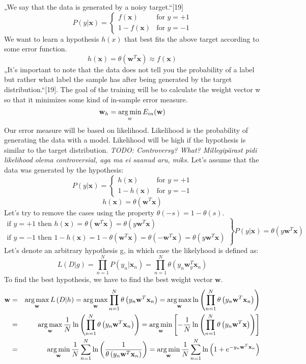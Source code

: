 „We say that the data is generated by a noisy target.“[19]
\[ P(y|\mathbf{x}) = \left\{
\begin{array}{ll}
f(\mathbf{x}) & \mbox{for } y = +1 \\
1 - f(\mathbf{x}) & \mbox{for } y = -1
\end{array} \right. \]
We want to learn a hypothesis $h(x)$ that best fits the above target according to some error function.
\[h(\mathbf{x}) = \theta \left( \mathbf{w}^T \mathbf{x} \right)\approx f(\mathbf{x})\]
„It's important to note that the data does not tell you the probability of a label but rather what label the sample has after being generated by the target distribution.“[19]. The goal of the training will be to calculate the weight vector w so that it minimizes some kind of in-sample error measure.
\[\mathbf{w}_h = \operatorname*{arg\,min}_w E_{in} (\mathbf{w})\]
Our error measure will be based on likelihood. Likelihood is the probability of generating the data with a model. Likelihood will be high if the hypothesis is similar to the target distribution. \emph{TODO: Controversy? What? Millegipärast pidi likelihood olema controversial, aga ma ei saanud aru, miks.} Let's assume that the data was generated by the hypothesis:
\[P(y|\mathbf{x}) = \left\{ 
\begin{array}{ll}
h(\mathbf{x}) & \mbox{for } y = + 1 \\
1 - h(\mathbf{x}) & \mbox{for } y = -1
\end{array}
\right.\]
\[h(\mathbf{x}) = \theta (\mathbf{w}^T \mathbf{x})\]
Let's try to remove the cases using the property $\theta(-s) = 1 - \theta (s)$.
\[\left.
\begin{array}{l}
\mbox{if $y=+1$ then } h(\mathbf{x}) = \theta (\mathbf{w}^T \mathbf{x}) = \theta (y \mathbf{w}^T \mathbf{x}) \\
\mbox{if $y=-1$ then } 1 - h(\mathbf{x}) = 1 - \theta (\mathbf{w}^T \mathbf{x}) = \theta (-\mathbf{w}^T \mathbf{x}) = \theta (y \mathbf{w}^T \mathbf{x})
\end{array}
\right\} P(y | \mathbf{x}) = \theta(y \mathbf{w}^T \mathbf{x})\]
Let's denote an arbitrary hypothesis g, in which case the likelyhood is defined as:
\[L(D|g) = \prod_{n=1}^N P(y_n | \mathbf{x}_n) = \prod_{n=1}^N \theta(y_n \mathbf{w}_g^T \mathbf{x}_n)\]
To find the best hypothesis, we have to find the best weight vector $\mathbf{w}$.
\begin{eqnarray*}
\mathbf{w} & = & \operatorname*{arg\,max}_\mathbf{w} L \left( D|h \right) = \operatorname*{arg\,max}_\mathbf{w} \prod_{n=1}^N  \theta \left( y_n \mathbf{w}^T \mathbf{x}_n \right) = \operatorname*{arg\,max}_\mathbf{w} \ln \left( \prod_{n=1}^N \theta\left( y_n \mathbf{w}^T \mathbf{x}_n \right) \right) \\
& = & \operatorname*{arg\,max}_\mathbf{w} \frac{1}{N} \ln \left( \prod_{n=1}^N \theta \left( y_n \mathbf{w}^T \mathbf{x}_n \right) \right) = \operatorname*{arg\,min}_\mathbf{w} \left[ - \frac{1}{N} \ln \left( \prod_{n=1}^N \theta \left( y_n \mathbf{w}^T \mathbf{x} \right) \right) \right] \\
& = & \operatorname*{arg\,min}_\mathbf{w} \frac{1}{N} \sum_{n=1}^N \ln \left( \frac{1}{\theta \left( y_n \mathbf{w}^T \mathbf{x}_n \right)} \right) = \operatorname*{arg\,min}_\mathbf{w} \frac{1}{N} \sum_{n=1}^N \ln \left( 1 + e^{-y_n \mathbf{w}^T \mathbf{x}_n} \right)
\end{eqnarray*}
